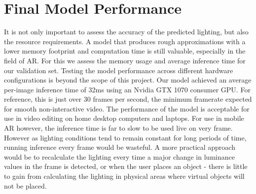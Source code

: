 \documentclass[ %
                    author={Gavin Parker},
                supervisor={Dr. Neill Campbell},
                    degree={MEng},
                     title={Deep Siamese Networks for Illumination Estimation from Stereo Images},
                  subtitle={},
                      type={research},
                      year={2018} ]{dissertation}
\begin{document}
\section{Final Model Performance}
It is not only important to assess the accuracy of the predicted lighting, but also the resource requirements. A model that produces rough approximations with a lower memory footprint and computation time is still valuable, especially in the field of AR. For this we assess the memory usage and average inference time for our validation set. Testing the model performance across different hardware configurations is beyond the scope of this project. Our model achieved an average per-image inference time of 32ms using an Nvidia GTX 1070 consumer GPU. For reference, this is just over 30 frames per second, the minimum framerate expected for smooth non-interactive video. The performance of the model is acceptable for use in video editing on home desktop computers and laptops. For use in mobile AR however, the inference time is far to slow to be used live on very frame. However as lighting conditions tend to remain constant for long periods of time, running inference every frame would be wasteful. A more practical approach would be to recalculate the lighting every time a major change in luminance values in the frame is detected, or when the user places an object - there is little to gain from calculating the lighting in physical areas where virtual objects will not be placed.
\end{document}
